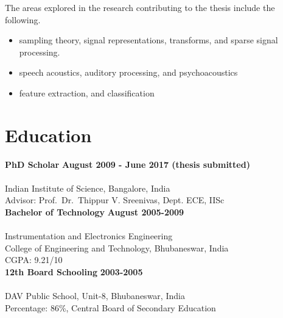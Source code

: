 \documentclass[line]{resume}
\begin{document}
{\begin{resume}
     The areas explored in the research contributing to the thesis include the following.
     \vspace{-3.5mm}
     \begin{itemize}
      \item sampling theory, signal representations, transforms, and sparse signal processing.
      \item speech acoustics, auditory processing, and psychoacoustics
      \item feature extraction, and classification
     \end{itemize}
   \vspace{-1.5mm}
    \section{\mysidestyle Education}
    \vspace{1mm}
    \textbf{PhD Scholar} \hfill \textbf{ August 2009 - June 2017 (thesis submitted)}\vspace{-3mm}\\\vspace{-1mm}\\%
    Indian Institute of Science, Bangalore, India \vspace{0mm}\\%
    Advisor:  Prof.~Dr.~Thippur V. Sreenivas, Dept. ECE, IISc\vspace{-6mm}\\

    \textbf{Bachelor of Technology} \hfill \textbf{ August 2005-2009}\vspace{-3mm}\\\vspace{-1mm}\\%
    Instrumentation and Electronics Engineering\\
    College of Engineering and Technology, Bhubaneswar, India \vspace{0mm}\\%
    CGPA: 9.21/10 \vspace{-6mm}\\

    \textbf{12th Board Schooling} \hfill \textbf{ 2003-2005}\vspace{-3mm}\\\vspace{-1mm}\\%
    DAV Public School, Unit-8, Bhubaneswar, India \vspace{0mm}\\%
    Percentage: 86\%, Central Board of Secondary Education\vspace{-6mm}\\
    

\end{resume}}
\end{document}
